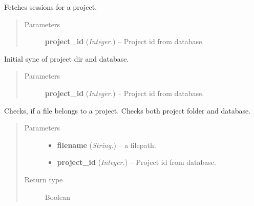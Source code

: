 \documentclass[letterpaper,10pt,english]{sphinxmanual}
\begin{document}

\begin{fulllineitems}
\label{controller:controller.GetSessionsByProject}
Fetches sessions for a project.
\begin{quote}\begin{description}
\item[{Parameters}] \leavevmode
\textbf{project\_id} (\emph{Integer.}) -- Project id from database.

\end{description}\end{quote}

\end{fulllineitems}


\begin{fulllineitems}
\label{controller:controller.InitSyncProjectDir}
Initial sync of project dir and database.
\begin{quote}\begin{description}
\item[{Parameters}] \leavevmode
\textbf{project\_id} (\emph{Integer.}) -- Project id from database.

\end{description}\end{quote}

\end{fulllineitems}


\begin{fulllineitems}
\label{controller:controller.IsProjectFile}
Checks, if a file belongs to a project. Checks both project folder
and database.
\begin{quote}\begin{description}
\item[{Parameters}] \leavevmode\begin{itemize}
\item {} 
\textbf{filename} (\emph{String.}) -- a filepath.

\item {} 
\textbf{project\_id} (\emph{Integer.}) -- Project id from database.

\end{itemize}

\item[{Return type}] \leavevmode
Boolean

\end{description}\end{quote}

\end{fulllineitems}
\end{document}
